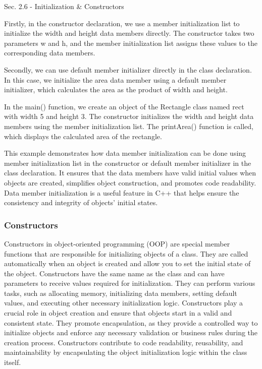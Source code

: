 \begin{notes}{Sec. 2.6 - Initialization \& Constructors}
\begin{highlight}
        Firstly, in the constructor declaration, we use a member initialization list to initialize the width and height data members directly. The constructor takes two parameters w and h, and the member initialization 
        list assigns these values to the corresponding data members.
    
        Secondly, we can use default member initializer directly in the class declaration. In this case, we initialize the area data member using a default member initializer, which calculates the area as the product 
        of width and height.
    
        In the main() function, we create an object of the Rectangle class named rect with width 5 and height 3. The constructor initializes the width and height data members using the member initialization list. The 
        printArea() function is called, which displays the calculated area of the rectangle.
    
        This example demonstrates how data member initialization can be done using member initialization list in the constructor or default member initializer in the class declaration. It ensures that the data members 
        have valid initial values when objects are created, simplifies object construction, and promotes code readability. Data member initialization is a useful feature in C++ that helps ensure the consistency and integrity of 
        objects' initial states.
    \end{highlight}
    
    \subsubsection*{Constructors}
    
    Constructors in object-oriented programming (OOP) are special member functions that are responsible for initializing objects of a class. They are called automatically when an object is created and allow you to set the initial 
    state of the object. Constructors have the same name as the class and can have parameters to receive values required for initialization. They can perform various tasks, such as allocating memory, initializing data members, 
    setting default values, and executing other necessary initialization logic. Constructors play a crucial role in object creation and ensure that objects start in a valid and consistent state. They promote encapsulation, as 
    they provide a controlled way to initialize objects and enforce any necessary validation or business rules during the creation process. Constructors contribute to code readability, reusability, and maintainability by encapsulating 
    the object initialization logic within the class itself.
    

\end{notes}
